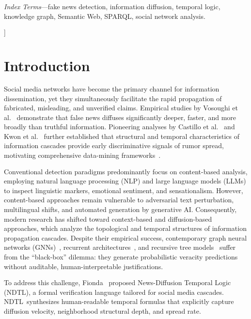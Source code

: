 \documentclass[10pt,twocolumn,a4paper]{article}
\newcommand{\NDTL}{\textsc{NDTL}}
\begin{document}
{\begin{@twocolumnfalse}
\begin{center}
\begin{minipage}{0.92\textwidth}
\vspace{4pt}
\noindent\textit{Index Terms}---fake news detection, information diffusion, temporal logic, knowledge graph, Semantic Web, SPARQL, social network analysis.
\end{minipage}
\end{center}
\vspace{10pt}
\end{@twocolumnfalse}
}]
\makeatother
 
\section{Introduction}
Social media networks have become the primary channel for information dissemination, yet they simultaneously facilitate the rapid propagation of fabricated, misleading, and unverified claims. Empirical studies by Vosoughi et al.~\cite{vosoughi2018} demonstrate that false news diffuses significantly deeper, faster, and more broadly than truthful information. Pioneering analyses by Castillo et al.~\cite{castillo2011} and Kwon et al.~\cite{kwon2013rumor} further established that structural and temporal characteristics of information cascades provide early discriminative signals of rumor spread, motivating comprehensive data-mining frameworks~\cite{shu2017mining}.

Conventional detection paradigms predominantly focus on content-based analysis, employing natural language processing (NLP) and large language models (LLMs) to inspect linguistic markers, emotional sentiment, and sensationalism. However, content-based approaches remain vulnerable to adversarial text perturbation, multilingual shifts, and automated generation by generative AI. Consequently, modern research has shifted toward context-based and diffusion-based approaches, which analyze the topological and temporal structures of information propagation cascades. Despite their empirical success, contemporary graph neural networks (GNNs)~\cite{bian2020, dou2021upfd, nguyen2020fang}, recurrent architectures~\cite{ma2016, liu2018ppc, ruchansky2017csi}, and recursive tree models~\cite{ma2018rvnn, lu2020gcan} suffer from the ``black-box'' dilemma: they generate probabilistic veracity predictions without auditable, human-interpretable justifications.

To address this challenge, Fionda~\cite{fionda2025} proposed News-Diffusion Temporal Logic (\NDTL), a formal verification language tailored for social media cascades. \NDTL\ synthesizes human-readable temporal formulas that explicitly capture diffusion velocity, neighborhood structural depth, and spread rate.
\end{document}
